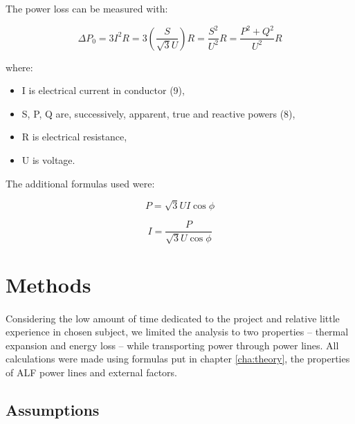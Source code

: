 \documentclass[a4paper]{article}
\begin{document}
The power loss can be measured with:

\begin{equation}
\Delta P_0 = 3I^{2}R = 3\left(\frac {S}{\sqrt{3}U}\right) R = \frac {S^{2}}{U^{2}} R = \frac {P^{2} + Q^{2}}{U^{2}} R
\end{equation}

where:
\begin{itemize}
	\setlength{\itemsep}{1pt}
	\setlength{\parskip}{0pt}
	\setlength{\parsep}{0pt}
\item I is electrical current in conductor (9),
\item S, P, Q are, successively, apparent, true and reactive powers (8),
\item R is electrical resistance,
\item U is voltage.
\end{itemize}

The additional formulas used were:

\begin{equation}
P = \sqrt{3}UI\cos{\phi}
\end{equation}

\begin{equation}
I = \frac {P}{\sqrt{3}U\cos{\phi}}
\end{equation}

\clearpage

%
\section{Methods}
\label{cha:methods}
\paragraph{}
Considering the low amount of time dedicated to the project and relative little experience in chosen subject, we limited the analysis to two properties -- thermal expansion and energy loss -- while transporting power through power lines. All calculations were made using formulas put in chapter \ref{cha:theory}, the properties of ALF power lines and external factors.

\subsection{Assumptions}
\label{sec:assumptions}
\paragraph{}
\end{document}
